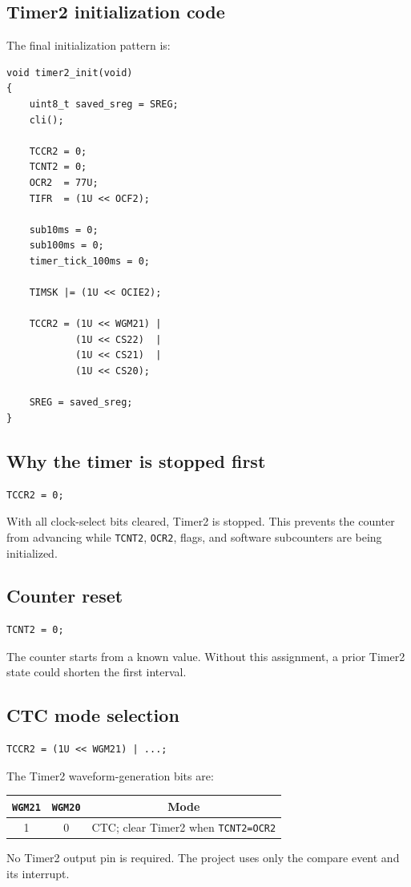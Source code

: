 \documentclass[11pt,a4paper]{article}
\begin{document}
\subsection{Timer2 initialization code}
The final initialization pattern is:
\begin{lstlisting}[style=cstyle,caption={Timer2 initialization used by the SmartSafe project.}]
void timer2_init(void)
{
    uint8_t saved_sreg = SREG;
    cli();

    TCCR2 = 0;
    TCNT2 = 0;
    OCR2  = 77U;
    TIFR  = (1U << OCF2);

    sub10ms = 0;
    sub100ms = 0;
    timer_tick_100ms = 0;

    TIMSK |= (1U << OCIE2);

    TCCR2 = (1U << WGM21) |
            (1U << CS22)  |
            (1U << CS21)  |
            (1U << CS20);

    SREG = saved_sreg;
}
\end{lstlisting}

\subsection{Why the timer is stopped first}
\begin{lstlisting}[style=cstyle]
TCCR2 = 0;
\end{lstlisting}
With all clock-select bits cleared, Timer2 is stopped. This prevents the counter from advancing while \texttt{TCNT2}, \texttt{OCR2}, flags, and software subcounters are being initialized.

\subsection{Counter reset}
\begin{lstlisting}[style=cstyle]
TCNT2 = 0;
\end{lstlisting}
The counter starts from a known value. Without this assignment, a prior Timer2 state could shorten the first interval.

\subsection{CTC mode selection}
\begin{lstlisting}[style=cstyle]
TCCR2 = (1U << WGM21) | ...;
\end{lstlisting}
The Timer2 waveform-generation bits are:
\begin{center}
\begin{tabular}{ccc}
\toprule
\texttt{WGM21} & \texttt{WGM20} & Mode \\
\midrule
1 & 0 & CTC; clear Timer2 when \texttt{TCNT2=OCR2} \\
\bottomrule
\end{tabular}
\end{center}
No Timer2 output pin is required. The project uses only the compare event and its interrupt.
\end{document}
